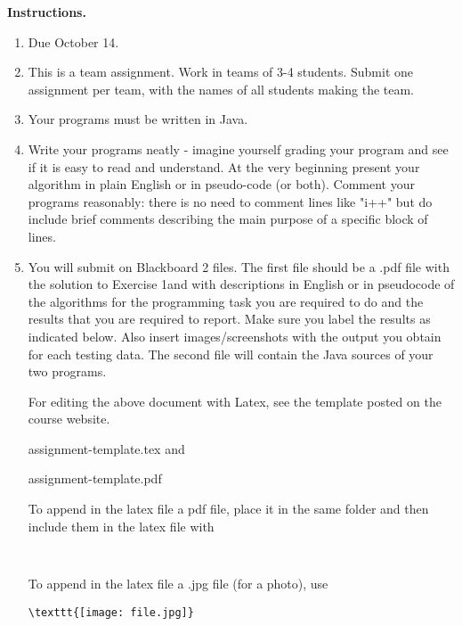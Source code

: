 \documentclass[11pt]{article}
\begin{document}
\vline

\textbf{Instructions.}
\begin{enumerate}
\item Due October 14.

\item This is a team assignment. Work in teams of 3-4 students.  Submit one assignment per team, with the names of all students making the team.
\item Your programs must be written in Java.
\item Write your programs neatly - imagine yourself grading your program and see if it is easy to read and understand. 
At the very beginning present your algorithm in plain English or in pseudo-code (or both).
Comment your programs reasonably: there is no need to comment lines like "i++" but do include brief comments describing the main purpose of a specific block of lines.
\item  You will submit on Blackboard 2 files. The first file should be a .pdf file  with the solution to Exercise 1and with  descriptions in English or in pseudocode of the algorithms  for the  programming task  you are required to do and the results that you are required to report.
Make sure you label the results as indicated below.   Also insert images/screenshots with the output you obtain for each testing data. The second file  will contain  the  Java sources of your two programs.






For editing the above document with  Latex, see the template posted on the course website. 
 
           assignment-template.tex	and
           
          assignment-template.pdf


To append in the  latex file  a pdf file, place it  in the same folder and then include them  in the latex file with 
\begin{verbatim}


\end{verbatim}
To append in the  latex file a .jpg file (for a photo), use 
\begin{verbatim}
\texttt{[image: file.jpg]}

\end{verbatim}


\end{enumerate}
\newpage
\end{document}
